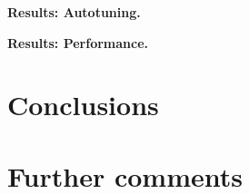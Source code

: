 \documentclass[letterpaper]{article}
\newcommand{\mypar}[1]{{\bf #1.}}
\begin{document}
\mypar{Results: Autotuning}

\mypar{Results: Performance}

\section{Conclusions}


\section{Further comments}

\end{document}
